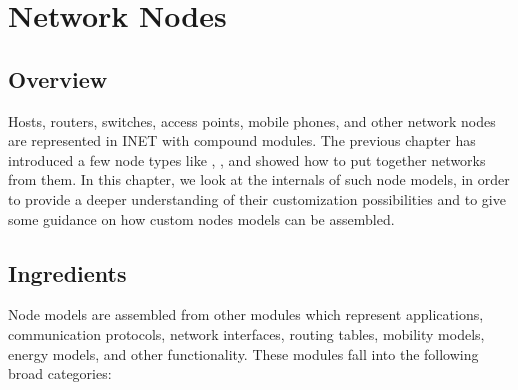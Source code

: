 \chapter{Network Nodes}
\label{cha:network-nodes}

\section{Overview}
\label{sec:nodes:overview}

Hosts, routers, switches, access points, mobile phones, and other network
nodes are represented in INET with compound modules. The previous chapter
has introduced a few node types like , ,
and showed how to put together networks from them. In this chapter,
we look at the internals of such node models, in order to provide a deeper
understanding of their customization possibilities and to give some guidance
on how custom nodes models can be assembled.

\section{Ingredients}
\label{sec:nodes:ingredients}

Node models are assembled from other modules which represent applications,
communication protocols, network interfaces, routing tables, mobility models,
energy models, and other functionality. These modules fall into the following
broad categories:

